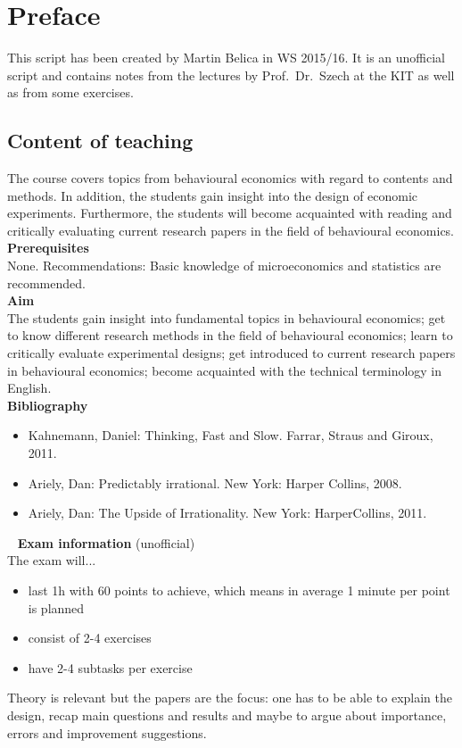 

\chapter*{Preface}
This script has been created by Martin Belica in WS 2015/16. It is an unofficial script and contains notes from the lectures by Prof.~Dr.~Szech at the KIT as well as from some exercises.
\section*{Content of teaching}
The course covers topics from behavioural economics with regard to contents and methods. In addition, the students gain insight into the design of economic experiments. Furthermore, the students will become acquainted with reading and critically evaluating current research papers in the field of behavioural economics. \\

\textbf{Prerequisites} \\
None. Recommendations: Basic knowledge of microeconomics and statistics are recommended. \\

\textbf{Aim} \\
The students gain insight into fundamental topics in behavioural economics;
get to know different research methods in the field of behavioural economics;
learn to critically evaluate experimental designs;
get introduced to current research papers in behavioural economics;
become acquainted with the technical terminology in English. \\

\textbf{Bibliography}
\begin{itemize}
	\item Kahnemann, Daniel: Thinking, Fast and Slow. Farrar, Straus and Giroux, 2011.
	\item Ariely, Dan: Predictably irrational. New York: Harper Collins, 2008.
	\item Ariely, Dan: The Upside of Irrationality. New York: HarperCollins, 2011. 
\end{itemize}
~\newline
\textbf{Exam information} (unofficial) \\
The exam will...
\begin{itemize}
	\item last 1h with 60 points to achieve, which means in average 1 minute per point is planned
	\item consist of 2-4 exercises
	\item have 2-4 subtasks per exercise 
\end{itemize}
Theory is relevant but the papers are the focus: one has to be able to explain the design, recap main questions and results and maybe to argue about importance, errors and improvement suggestions.
